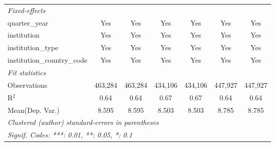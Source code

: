 \begin{tabular}{lcccccc}
   \midrule
   \emph{Fixed-effects}\\
   quarter\_year                      & Yes     & Yes        & Yes         & Yes         & Yes     & Yes\\  
   institution                        & Yes     & Yes        & Yes         & Yes         & Yes     & Yes\\  
   institution\_type                  & Yes     & Yes        & Yes         & Yes         & Yes     & Yes\\  
   institution\_country\_code         & Yes     & Yes        & Yes         & Yes         & Yes     & Yes\\  
   \midrule
   \emph{Fit statistics}\\
   Observations                       & 463,284 & 463,284    & 434,106     & 434,106     & 447,927 & 447,927\\  
   R$^2$                              & 0.64    & 0.64       & 0.67        & 0.67        & 0.64    & 0.64\\  
Mean(Dep. Var.) & 8.595 & 8.595 & 8.503 & 8.503 & 8.785 & 8.785 \\
   \midrule \midrule
   \multicolumn{7}{l}{\emph{Clustered (author) standard-errors in parentheses}}\\
   \multicolumn{7}{l}{\emph{Signif. Codes: ***: 0.01, **: 0.05, *: 0.1}}\\
\end{tabular}
\par\endgroup
